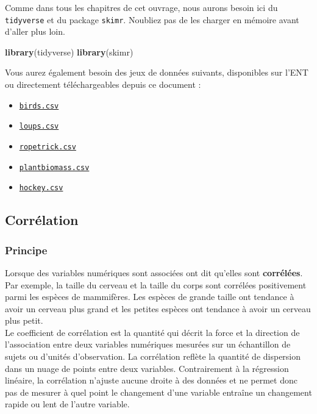 \documentclass[a4paperpaper,]{article}
\newenvironment{Shaded}{\begin{snugshade}}{\end{snugshade}}
\newcommand{\KeywordTok}[1]{\textcolor[rgb]{0.12,0.11,0.11}{\textbf{#1}}}
\newcommand{\NormalTok}[1]{\textcolor[rgb]{0.12,0.11,0.11}{#1}}
\providecommand{\tightlist}{%
  \setlength{\itemsep}{0pt}\setlength{\parskip}{0pt}}
\begin{document}
Comme dans tous les chapitres de cet ouvrage, nous aurons besoin ici du \texttt{tidyverse} et du package \texttt{skimr}. Noubliez pas de les charger en mémoire avant d'aller plus loin.

\begin{Shaded}
\begin{Highlighting}[]
\KeywordTok{library}\NormalTok{(tidyverse)}
\KeywordTok{library}\NormalTok{(skimr)}
\end{Highlighting}
\end{Shaded}

Vous aurez également besoin des jeux de données suivants, disponibles sur l'ENT ou directement téléchargeables depuis ce document :

\begin{itemize}
\tightlist
\item
  \href{https://besibo.github.io/Biometrie3/data/birds.csv}{\texttt{birds.csv}}
\item
  \href{https://besibo.github.io/Biometrie3/data/loups.csv}{\texttt{loups.csv}}
\item
  \href{https://besibo.github.io/Biometrie3/data/ropetrick.csv}{\texttt{ropetrick.csv}}
\item
  \href{https://besibo.github.io/Biometrie3/data/plantbiomass.csv}{\texttt{plantbiomass.csv}}
\item
  \href{https://besibo.github.io/Biometrie3/data/hockey.csv}{\texttt{hockey.csv}}
\end{itemize}

\hypertarget{corruxe9lation}{%
\subsection{Corrélation}\label{corruxe9lation}}

\hypertarget{principe-1}{%
\subsubsection{Principe}\label{principe-1}}

Lorsque des variables numériques sont associées ont dit qu'elles sont \textbf{corrélées}. Par exemple, la taille du cerveau et la taille du corps sont corrélées positivement parmi les espèces de mammifères. Les espèces de grande taille ont tendance à avoir un cerveau plus grand et les petites espèces ont tendance à avoir un cerveau plus petit.\\
Le coefficient de corrélation est la quantité qui décrit la force et la direction de l'association entre deux variables numériques mesurées sur un échantillon de sujets ou d'unités d'observation. La corrélation reflète la quantité de dispersion dans un nuage de points entre deux variables. Contrairement à la régression linéaire, la corrélation n'ajuste aucune droite à des données et ne permet donc pas de mesurer à quel point le changement d'une variable entraîne un changement rapide ou lent de l'autre variable.
\end{document}
